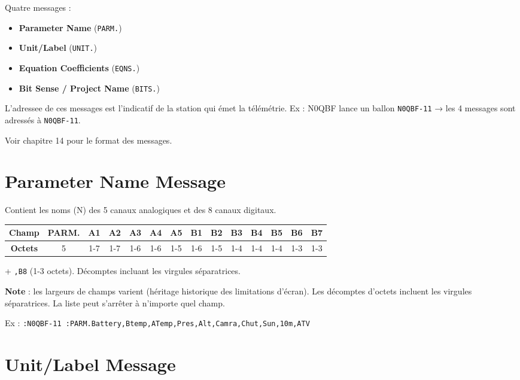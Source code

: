 Quatre messages :

\begin{itemize}
\tightlist
\item
  \textbf{Parameter Name} (\texttt{PARM.})
\item
  \textbf{Unit/Label} (\texttt{UNIT.})
\item
  \textbf{Equation Coefficients} (\texttt{EQNS.})
\item
  \textbf{Bit Sense / Project Name} (\texttt{BITS.})
\end{itemize}

L'adressee de ces messages est l'indicatif de la station qui émet la
télémétrie. Ex : N0QBF lance un ballon \texttt{N0QBF-11} → les 4
messages sont adressés à \texttt{N0QBF-11}.

Voir chapitre 14 pour le format des messages.

\section{Parameter Name Message}\label{parameter-name-message}

Contient les noms (N) des 5 canaux analogiques et des 8 canaux digitaux.

\begin{center}
\small
\begin{tabular}{|c|c|c|c|c|c|c|c|c|c|c|c|c|c|}
\hline
\textbf{Champ} & PARM. & A1 & \lit{,}A2 & \lit{,}A3 & \lit{,}A4 & \lit{,}A5 & \lit{,}B1 & \lit{,}B2 & \lit{,}B3 & \lit{,}B4 & \lit{,}B5 & \lit{,}B6 & \lit{,}B7 \\
\hline
\textbf{Octets} & 5 & 1-7 & 1-7 & 1-6 & 1-6 & 1-5 & 1-6 & 1-5 & 1-4 & 1-4 & 1-4 & 1-3 & 1-3 \\
\hline
\end{tabular}
\end{center}
\noindent + \texttt{,B8} (1-3 octets). Décomptes incluant les virgules séparatrices.

\textbf{Note} : les largeurs de champs varient (héritage historique des
limitations d'écran). Les décomptes d'octets incluent les virgules
séparatrices. La liste peut s'arrêter à n'importe quel champ.

Ex :
\texttt{:N0QBF-11\ :PARM.Battery,Btemp,ATemp,Pres,Alt,Camra,Chut,Sun,10m,ATV}

\section{Unit/Label Message}\label{unitlabel-message}

